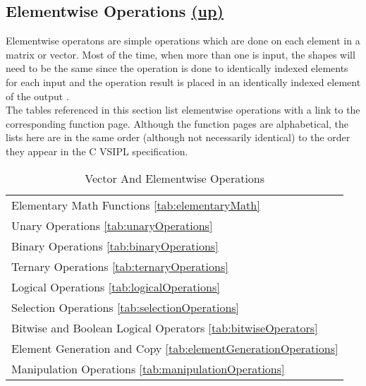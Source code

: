 \subsection*{Elementwise Operations \hyperlink{VSIPspecHead}{(up)}}
Elementwise operatons are simple operations which are done on each element in a matrix or vector. Most of the time, when more than one  is input, the  shapes will need to be the same since the operation is done to identically indexed elements for each input  and the operation result is placed in an identically indexed element of the output . \\
The tables referenced in this section list elementwise operations with a link to the corresponding function page. Although the function pages are alphabetical, the lists here are in the same order (although not necessarily identical) to the order they appear in the C VSIPL specification.\\
\begin{table}[H]
\hypertarget{vectorAndElementwise}{}
\caption{Vector And Elementwise Operations}
\label{tab:elementwiseChapter}
\begin{center}
\begin{tabular}{|l|}\hline
Elementary Math Functions \ref{tab:elementaryMath}\\
Unary Operations \ref{tab:unaryOperations}\\
Binary Operations \ref{tab:binaryOperations}\\
Ternary Operations \ref{tab:ternaryOperations}\\
Logical Operations \ref{tab:logicalOperations}\\
Selection Operations \ref{tab:selectionOperations}\\
Bitwise and Boolean Logical Operators \ref{tab:bitwiseOperators}\\
Element Generation and Copy \ref{tab:elementGenerationOperations}\\
Manipulation Operations \ref{tab:manipulationOperations}\\
\hline\end{tabular}
\end{center}
\label{default}
\end{table}%